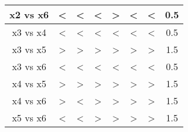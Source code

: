 \documentclass[a4paper,14pt]{extreport}
\begin{document}
\begin{table}[h]
\begin{center}
\begin{tabular}{|c|ccccc|c|c|}
x2 vs x6          & \multicolumn{1}{c|}{<} & \multicolumn{1}{c|}{<} & \multicolumn{1}{c|}{<} & \multicolumn{1}{c|}{>} & < & <                                  & 0.5                               \\ \hline
x3 vs x4          & \multicolumn{1}{c|}{<} & \multicolumn{1}{c|}{<} & \multicolumn{1}{c|}{<} & \multicolumn{1}{c|}{<} & < & <                                  & 0.5                               \\ \hline
x3 vs x5          & \multicolumn{1}{c|}{>} & \multicolumn{1}{c|}{>} & \multicolumn{1}{c|}{>} & \multicolumn{1}{c|}{>} & > & >                                  & 1.5                               \\ \hline
x3 vs x6          & \multicolumn{1}{c|}{<} & \multicolumn{1}{c|}{<} & \multicolumn{1}{c|}{<} & \multicolumn{1}{c|}{<} & < & <                                  & 0.5                               \\ \hline
x4 vs x5          & \multicolumn{1}{c|}{>} & \multicolumn{1}{c|}{>} & \multicolumn{1}{c|}{>} & \multicolumn{1}{c|}{>} & > & >                                  & 1.5                               \\ \hline
x4 vs x6          & \multicolumn{1}{c|}{>} & \multicolumn{1}{c|}{<} & \multicolumn{1}{c|}{>} & \multicolumn{1}{c|}{>} & > & >                                  & 1.5                               \\ \hline
x5 vs x6          & \multicolumn{1}{c|}{<} & \multicolumn{1}{c|}{<} & \multicolumn{1}{c|}{>} & \multicolumn{1}{c|}{>} & > & >                                  & 1.5                               \\ \hline
\end{tabular}
\end{center} 
\end{table}
\end{document}
